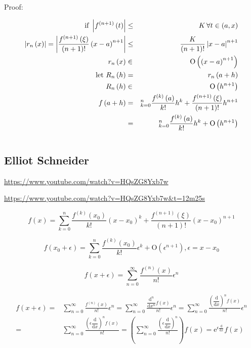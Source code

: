 \documentclass[
]{book}
\theoremstyle{definition}
\theoremstyle{definition}
\theoremstyle{definition}
\theoremstyle{definition}
\theoremstyle{remark}
\begin{document}
Proof:

\begin{eqnarray}
\textrm{if }\left|f^{\left(n+1\right)}\left(t\right)\right| & \le & K\thinspace\forall t\in\left(a,x\right)\\
\left|r_{n}\left(x\right)\right|=\left|\frac{f^{\left(n+1\right)}\left(\xi\right)}{\left(n+1\right)!}\left(x-a\right)^{n+1}\right| & \le & \frac{K}{\left(n+1\right)!}\left|x-a\right|^{n+1}\\
r_{n}\left(x\right) & \in & \mathrm{O}\left(\left(x-a\right)^{n+1}\right)\\
\textrm{let }R_{n}\left(h\right) & = & r_{n}\left(a+h\right)\\
R_{n}\left(h\right) & \in & \mathrm{O}\left(h^{n+1}\right)\\
f\left(a+h\right) & = & \sum_{k=0}^{n}\frac{f^{\left(k\right)}\left(a\right)}{k!}h^{k}+\frac{f^{\left(n+1\right)}\left(\xi\right)}{\left(n+1\right)!}h^{n+1}\\
 & = & \sum_{k=0}^{n}\frac{f^{\left(k\right)}\left(a\right)}{k!}h^{k}+\mathrm{O}\left(h^{n+1}\right)
\end{eqnarray}

\[
\tag*{$\Box$}
\]

\subsection{Elliot Schneider}\label{elliot-schneider-1}

\url{https://www.youtube.com/watch?v=HQsZG8Yxb7w}

\url{https://www.youtube.com/watch?v=HQsZG8Yxb7w&t=12m25s}

\[
f\left(x\right)=\sum\limits _{k=0}^{n}\frac{f^{\left(k\right)}\left(x_{{\scriptscriptstyle 0}}\right)}{k!}\left(x-x_{{\scriptscriptstyle 0}}\right)^{k}+\frac{f^{\left(n+1\right)}\left(\xi\right)}{\left(n+1\right)!}\left(x-x_{{\scriptscriptstyle 0}}\right)^{n+1}
\]

\[
f\left(x_{{\scriptscriptstyle 0}}+\epsilon\right)=\sum\limits _{k=0}^{n}\frac{f^{\left(k\right)}\left(x_{{\scriptscriptstyle 0}}\right)}{k!}\epsilon^{k}+\mathrm{O}\left(\epsilon^{n+1}\right),\epsilon=x-x_{{\scriptscriptstyle 0}}
\]

\[
f\left(x+\epsilon\right)=\sum\limits _{n=0}^{\infty}\frac{f^{\left(n\right)}\left(x\right)}{n!}\epsilon^{n}
\]

\[
\begin{aligned}
f\left(x+\epsilon\right)= & \sum\limits _{n=0}^{\infty}\frac{f^{\left(n\right)}\left(x\right)}{n!}\epsilon^{n}=\sum\limits _{n=0}^{\infty}\frac{\dfrac{\mathrm{d}^{n}}{\mathrm{d}x^{n}}f\left(x\right)}{n!}\epsilon^{n}=\sum\limits _{n=0}^{\infty}\frac{\left(\dfrac{\mathrm{d}}{\mathrm{d}x}\right)^{n}f\left(x\right)}{n!}\epsilon^{n}\\
= & \sum\limits _{n=0}^{\infty}\frac{\left(\epsilon\dfrac{\mathrm{d}}{\mathrm{d}x}\right)^{n}f\left(x\right)}{n!}=\left(\sum\limits _{n=0}^{\infty}\frac{\left(\epsilon\dfrac{\mathrm{d}}{\mathrm{d}x}\right)^{n}}{n!}\right)f\left(x\right)=\mathrm{e}^{{\scriptscriptstyle \epsilon\frac{\mathrm{d}}{\mathrm{d}x}}}f\left(x\right)
\end{aligned}
\]
\end{document}
